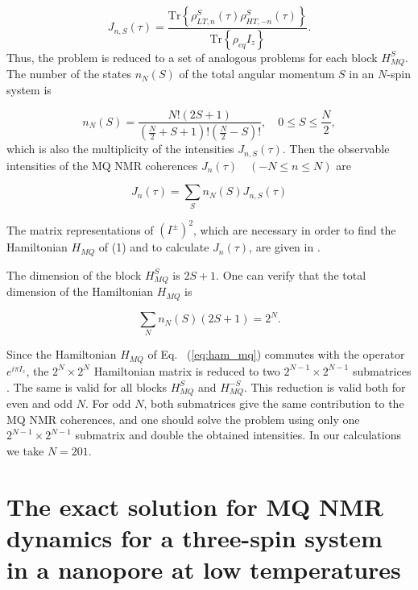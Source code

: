 \documentclass[%
 reprint,
superscriptaddress,
 amsmath,amssymb,
]{revtex4-2}
\begin{document}
\begin{equation}
    \label{eq:coherence_k_s}
    J_{n, S}(\tau) = \dfrac{\mathrm{Tr}\left\{
        \rho_{LT, n}^S(\tau)\rho_{HT, -n}^S(\tau)
    \right\}}
    {\mathrm{Tr}\left\{\rho_{eq} I_z\right\}}.
\end{equation}
Thus, the problem is reduced to a set of analogous problems for each block $H_{MQ}^S$. The number of the states $n_N(S)$ of the total angular momentum $S$ in an $N$-spin system is \cite{Landau}

\begin{equation}
    \label{eq:coeff_n}
    n_N(S)  = \dfrac{ N! (2S+1)}
    {(\frac N 2 + S + 1)!(\frac N 2 - S)!}, 
    \quad
    0\leq S \leq \frac N 2, 
\end{equation}
which is also the multiplicity of the intensities $J_{n, S}(\tau)$. Then the observable intensities of the  MQ NMR coherences $J_n(\tau)\quad(-N\leq n \leq N)$ are 

\begin{equation}
    \label{eq:coherence_k}
    J_n(\tau) = \sum\limits_S n_N(S) J_{n, S}(\tau)
\end{equation}

The matrix representations of $(I^{\pm})^2$, which are necessary in order to find the Hamiltonian $H_{MQ}$ of (1) and to calculate $J_n(\tau)$, are given in \cite{lab:mq_nmr_dyn_in_nanopores_2009}. 

The dimension of the block $H_{MQ}^S$ is $2S+1$. One can verify \cite{lab:mq_nmr_dyn_in_nanopores_2009} that the total dimension of the Hamiltonian $H_{MQ}$ is 

\begin{equation}
    \sum\limits_N n_N(S)(2S+1) = 2^N.
\end{equation}

Since the Hamiltonian $H_{MQ}$ of Eq.   ~(\ref{eq:ham_mq}) commutes with the operator $e^{i\pi I_z}$, the $2^N\times2^N$ Hamiltonian matrix is reduced to two $2^{N-1}\times2^{N-1}$ submatrices \cite{lab:mq_nmr_dyn_in_nanopores_2009}. The same is valid for all blocks $H_{MQ}^S$ and $H_{MQ}^{-S}$. This reduction is valid both for even and odd $N$. For odd $N$, both submatrices give the same contribution to the MQ NMR coherences, and one should solve the problem using only one $2^{N-1}\times2^{N-1}$ submatrix and double the obtained intensities. In our calculations we take $N=201$.


\section{The exact solution for MQ NMR dynamics for a three-spin system in a nanopore at low temperatures}
\label{sec:exact_sol}
\end{document}

